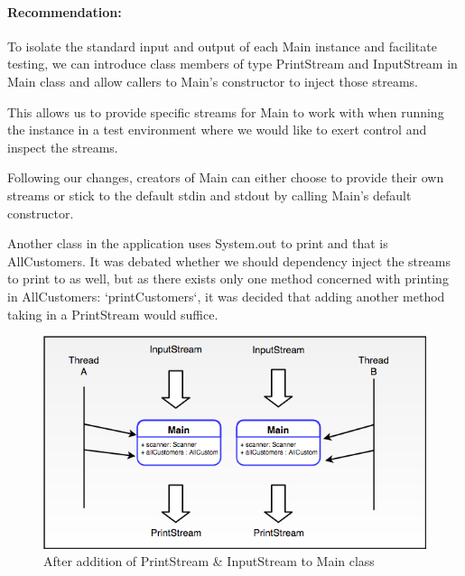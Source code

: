 \paragraph{Recommendation:}
To isolate the standard input and output of each Main instance and facilitate testing, we can introduce class members of type PrintStream and InputStream in Main class and allow callers to Main's constructor to inject those streams.
\par
This allows us to provide specific streams for Main to work with when running the instance in a test environment where we would like to exert control and inspect the streams. 
\par 
Following our changes, creators of Main can either choose to provide their own streams or stick to the default stdin and stdout by calling Main's default constructor. 
\par
Another class in the application uses System.out to print and that is AllCustomers. It was debated whether we should dependency inject the streams to print to as well, but as there exists only one method concerned with printing in AllCustomers: `printCustomers`, it was decided that adding another  method taking in a PrintStream would suffice.
\begin{figure}[H]
	\centering
	\includegraphics[scale=0.4]{res/STE-Page-3-original.png}
	\caption{After addition of PrintStream \& InputStream to Main class}
\end{figure}
\par


